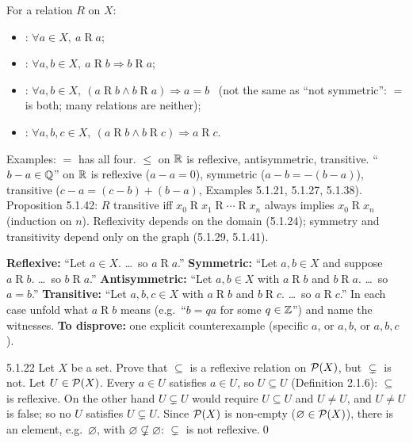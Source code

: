 \begin{key}
For a relation $R$ on $X$:
\begin{itemize}
\item {}: $\forall a\in X,\ a\mathrel Ra$;
\item {}: $\forall a,b\in X,\ a\mathrel Rb\Rightarrow b\mathrel Ra$;
\item {}: $\forall a,b\in X,\ (a\mathrel Rb\wedge b\mathrel Ra)\Rightarrow a=b$ \ (not the same as ``not symmetric'': $=$ is both; many relations are neither);
\item {}: $\forall a,b,c\in X,\ (a\mathrel Rb\wedge b\mathrel Rc)\Rightarrow a\mathrel Rc$.
\end{itemize}
Examples: $=$ has all four. $\le$ on $\mathbb{R}$ is reflexive, antisymmetric, transitive. ``$b-a\in\mathbb{Q}$'' on $\mathbb{R}$ is reflexive ($a-a=0$), symmetric ($a-b=-(b-a)$), transitive ($c-a=(c-b)+(b-a)$, Examples 5.1.21, 5.1.27, 5.1.38). Proposition 5.1.42: $R$ transitive iff $x_0\mathrel Rx_1\mathrel R\cdots\mathrel Rx_n$ always implies $x_0\mathrel Rx_n$ (induction on $n$). Reflexivity depends on the domain (5.1.24); symmetry and transitivity depend only on the graph (5.1.29, 5.1.41).
\end{key}
\begin{strategy}
\textbf{Reflexive:} ``Let $a\in X$. \dots\ so $a\mathrel Ra$.'' \textbf{Symmetric:} ``Let $a,b\in X$ and suppose $a\mathrel Rb$. \dots\ so $b\mathrel Ra$.'' \textbf{Antisymmetric:} ``Let $a,b\in X$ with $a\mathrel Rb$ and $b\mathrel Ra$. \dots\ so $a=b$.'' \textbf{Transitive:} ``Let $a,b,c\in X$ with $a\mathrel Rb$ and $b\mathrel Rc$. \dots\ so $a\mathrel Rc$.'' In each case unfold what $a\mathrel Rb$ means (e.g.\ ``$b=qa$ for some $q\in\mathbb{Z}$'') and name the witnesses. \textbf{To disprove:} one explicit counterexample (specific $a$, or $a,b$, or $a,b,c$).
\end{strategy}

\begin{bookex}[essential]{5.1.22}
Let $X$ be a set. Prove that $\subseteq$ is a reflexive relation on $\mathcal{P}(X)$, but $\subsetneq$ is not.
\solution
Let $U\in\mathcal{P}(X)$. Every $a\in U$ satisfies $a\in U$, so $U\subseteq U$ (Definition 2.1.6): $\subseteq$ is reflexive. On the other hand $U\subsetneq U$ would require $U\subseteq U$ and $U\ne U$, and $U\ne U$ is false; so no $U$ satisfies $U\subsetneq U$. Since $\mathcal{P}(X)$ is non-empty ($\varnothing\in\mathcal{P}(X)$), there is an element, e.g.\ $\varnothing$, with $\varnothing\not\subsetneq\varnothing$: $\subsetneq$ is not reflexive.\qed
\end{bookex}

